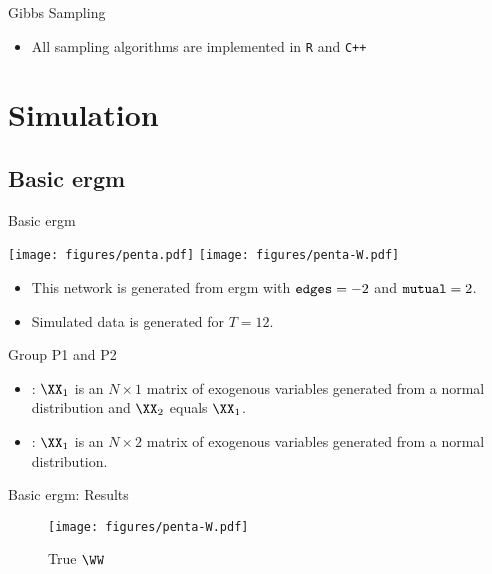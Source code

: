 \documentclass{beamer}
\begin{document}
\begin{frame}[fragile]{Gibbs Sampling}
	\begin{block}{}
		
	\end{block}
	\begin{itemize}
		\item
			All sampling algorithms are implemented in \texttt{R} and \texttt{C++}
	\end{itemize}
\end{frame}

\section{Simulation}

\subsection{Basic \acrshort{ergm}}

\begin{frame}{Basic \acrshort{ergm}}
	\begin{center}
		\texttt{[image: figures/penta.pdf]}
		\texttt{[image: figures/penta-W.pdf]}
	\end{center}
	\begin{itemize}
		\item
			This network is generated from \acrshort{ergm} with
			$\text{\texttt{edges}}=-2$ and
			$\text{\texttt{mutual}}=2$.
		\item
			Simulated data is generated for $T=12$.
	\end{itemize}
\end{frame}

\begin{frame}{Group P1 and P2}
	\begin{itemize}
		\item{}:
			$\XX_1$ is an $N\times 1$ matrix of exogenous variables generated from a normal distribution and $\XX_{2}$ equals $\XX_{1}$.
		\item{}:
			$\XX_1$ is an $N\times 2$ matrix of exogenous variables generated from a normal distribution.
	\end{itemize}
\end{frame}

\begin{frame}{Basic \acrshort{ergm}: Results}
	\begin{figure}[H]
		\centering
		\texttt{[image: figures/penta-W.pdf]}
		\caption{True $\WW$}
	\end{figure}
\end{frame}
\end{document}
